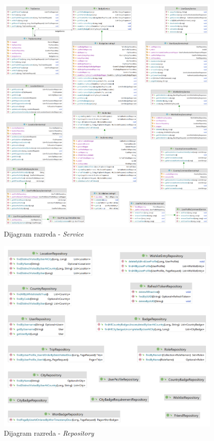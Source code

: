                 \begin{figure}[H]
        			\includegraphics[scale=0.12]{slike/class/class_service.png} %
        		\centering
        		\caption{Dijagram razreda - \textit{Service}}
        	\end{figure}

                 \begin{figure}[H]
        			\includegraphics[scale=0.2]{slike/class/class_respository.png} %
        		\centering
        		\caption{Dijagram razreda - \textit{Repository}}

        	\end{figure}
                \eject
        
